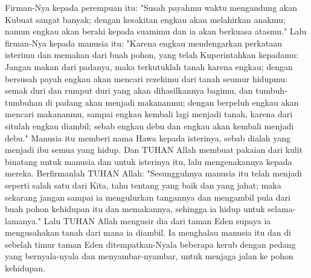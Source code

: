 \begin{biblechapter}
\verse Firman-Nya kepada perempuan itu: "Susah payahmu waktu mengandung akan Kubuat sangat banyak; dengan kesakitan engkau akan melahirkan anakmu; namun engkau akan berahi kepada suamimu dan ia akan berkuasa atasmu."
\verse Lalu firman-Nya kepada manusia itu: "Karena engkau mendengarkan perkataan isterimu dan memakan dari buah pohon, yang telah Kuperintahkan kepadamu: Jangan makan dari padanya, maka terkutuklah tanah karena engkau; dengan bersusah payah engkau akan mencari rezekimu dari tanah seumur hidupmu:
\verse semak duri dan rumput duri yang akan dihasilkannya bagimu, dan tumbuh-tumbuhan di padang akan menjadi makananmu;
\verse dengan berpeluh engkau akan mencari makananmu, sampai engkau kembali lagi menjadi tanah, karena dari situlah engkau diambil; sebab engkau debu dan engkau akan kembali menjadi debu."
\verse Manusia itu memberi nama Hawa kepada isterinya, sebab dialah yang menjadi ibu semua yang hidup.
\verse Dan TUHAN Allah membuat pakaian dari kulit binatang untuk manusia dan untuk isterinya itu, lalu mengenakannya kepada mereka.
\verse Berfirmanlah TUHAN Allah: "Sesungguhnya manusia itu telah menjadi seperti salah satu dari Kita, tahu tentang yang baik dan yang jahat; maka sekarang jangan sampai ia mengulurkan tangannya dan mengambil pula dari buah pohon kehidupan itu dan memakannya, sehingga ia hidup untuk selama-lamanya."
\verse Lalu TUHAN Allah mengusir dia dari taman Eden supaya ia mengusahakan tanah dari mana ia diambil.
\verse Ia menghalau manusia itu dan di sebelah timur taman Eden ditempatkan-Nyala beberapa kerub dengan pedang yang bernyala-nyala dan menyambar-nyambar, untuk menjaga jalan ke pohon kehidupan.
\end{biblechapter}

